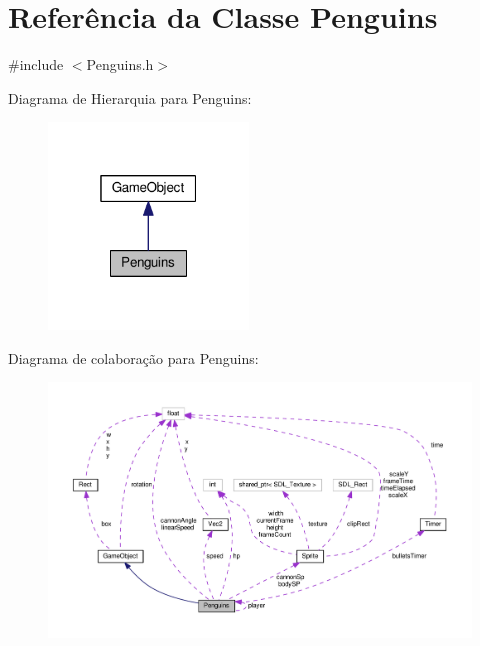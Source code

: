 \hypertarget{classPenguins}{\section{Referência da Classe Penguins}
\label{classPenguins}
}


{\ttfamily \#include $<$Penguins.\+h$>$}



Diagrama de Hierarquia para Penguins\+:\nopagebreak
\begin{figure}[H]
\begin{center}
\leavevmode
\includegraphics[width=151pt]{classPenguins__inherit__graph}
\end{center}
\end{figure}


Diagrama de colaboração para Penguins\+:\nopagebreak
\begin{figure}[H]
\begin{center}
\leavevmode
\includegraphics[width=350pt]{classPenguins__coll__graph}
\end{center}
\end{figure}
